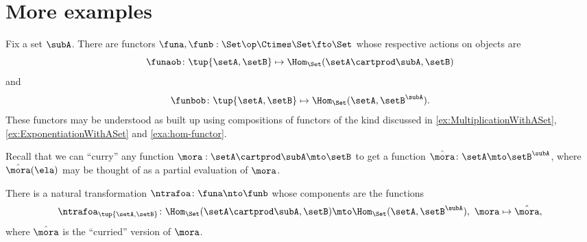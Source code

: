 \section{More examples}




\begin{example}
    Fix a set $\subA$.
    There are functors $\funa, \funb: \Set\op \Ctimes \Set \fto \Set$ whose respective actions on objects are
    \begin{equation}
        \funaob \colon \tup{\setA, \setB} \mapsto \Hom_\Set(\setA \cartprod \subA, \setB)
    \end{equation}
    and
    \begin{equation}
        \funbob \colon \tup{\setA, \setB} \mapsto \Hom_\Set(\setA, \setB^\subA).
    \end{equation}
    These functors may be understood as built up using compositions of functors of the kind discussed in \cref{ex:MultiplicationWithASet}, \cref{ex:ExponentiationWithASet} and \cref{exa:hom-functor}.

    Recall that we can ``curry'' any function $\mora : \setA \cartprod \subA \mto \setB$ to get a function $\hat \mora \colon \setA \mto \setB^\subA$, where $\hat \mora(\ela)$ may be thought of as a partial evaluation of $\mora$.

    There is a natural transformation $\ntrafoa \colon \funa \nto \funb$ whose components are the functions
    \begin{equation}\label{eq:currying-nat-trafo}
        \ntrafoa_{\tup{\setA, \setB}} \colon \Hom_\Set(\setA \cartprod \subA, \setB) \mto \Hom_\Set(\setA, \setB^\subA), \ \mora \mapsto \hat \mora,
    \end{equation}
    where $\hat \mora$ is the ``curried'' version of $\mora$.
\end{example}

\vfill

\begin{marginfigure}
    \centering
    \caption{}
    \label{fig:graph-cat-again}
\end{marginfigure}

